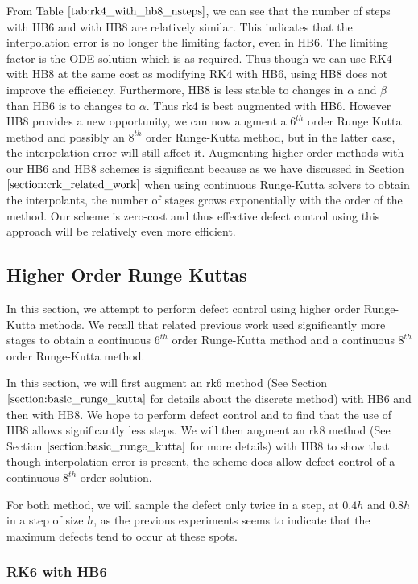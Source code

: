 \documentclass{article}
\begin{document}
From Table $\ref{tab:rk4_with_hb8_nsteps}$, we can see that the number of steps with HB6 and with HB8 are relatively similar. This indicates that the interpolation error is no longer the limiting factor, even in HB6. The limiting factor is the ODE solution which is as required. Thus though we can use RK4 with HB8 at the same cost as modifying RK4 with HB6, using HB8 does not improve the efficiency. Furthermore, HB8 is less stable to changes in $\alpha$ and $\beta$ than HB6 is to changes to $\alpha$. Thus rk4 is best augmented with HB6. However HB8 provides a new opportunity, we can now augment a $6^{th}$ order Runge Kutta method and possibly an $8^{th}$ order Runge-Kutta method, but in the latter case, the interpolation error will still affect it. Augmenting higher order methods with our HB6 and HB8 schemes is significant because as we have discussed in Section $\ref{section:crk_related_work}$ when using continuous Runge-Kutta solvers to obtain the interpolants, the number of stages grows exponentially with the order of the method. Our scheme is zero-cost and thus effective defect control using this approach will be relatively even more efficient.


\subsection{Higher Order Runge Kuttas}
\label{section:HBs_and_higher_order_RK}
In this section, we attempt to perform defect control using higher order Runge-Kutta methods. We recall that related previous work used significantly more stages to obtain a continuous $6^{th}$ order Runge-Kutta method and a continuous $8^{th}$ order Runge-Kutta method.

In this section, we will first augment an rk6 method (See Section $\ref{section:basic_runge_kutta}$ for details about the discrete method) with HB6 and then with HB8. We hope to perform defect control and to find that the use of HB8 allows significantly less steps. We will then augment an rk8 method (See Section $\ref{section:basic_runge_kutta}$ for more details) with HB8 to show that though interpolation error is present, the scheme does allow defect control of a continuous $8^{th}$ order solution. 

For both method, we will sample the defect only twice in a step, at $0.4h$ and $0.8h$ in a step of size $h$, as the previous experiments seems to indicate that the maximum defects tend to occur at these spots.

\subsubsection{RK6 with HB6}
\end{document}
